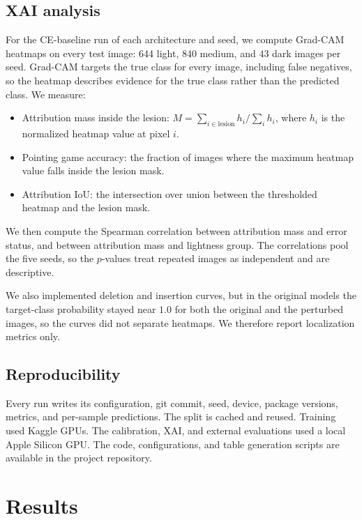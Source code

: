 \documentclass[11pt]{article}
\begin{document}
\subsection{XAI analysis}

For the CE-baseline run of each architecture and seed, we compute Grad-CAM heatmaps on every test image: 644 light, 840 medium, and 43 dark images per seed. Grad-CAM targets the true class for every image, including false negatives, so the heatmap describes evidence for the true class rather than the predicted class. We measure:

\begin{itemize}
  \item Attribution mass inside the lesion: $M=\sum_{i\in\mathrm{lesion}}h_i/\sum_i h_i$, where $h_i$ is the normalized heatmap value at pixel $i$.
  \item Pointing game accuracy: the fraction of images where the maximum heatmap value falls inside the lesion mask.
  \item Attribution IoU: the intersection over union between the thresholded heatmap and the lesion mask.
\end{itemize}

We then compute the Spearman correlation between attribution mass and error status, and between attribution mass and lightness group. The correlations pool the five seeds, so the $p$-values treat repeated images as independent and are descriptive.

We also implemented deletion and insertion curves, but in the original models the target-class probability stayed near $1.0$ for both the original and the perturbed images, so the curves did not separate heatmaps. We therefore report localization metrics only.

\subsection{Reproducibility}

Every run writes its configuration, git commit, seed, device, package versions, metrics, and per-sample predictions. The split is cached and reused. Training used Kaggle GPUs. The calibration, XAI, and external evaluations used a local Apple Silicon GPU. The code, configurations, and table generation scripts are available in the project repository.

\section{Results}
\end{document}
